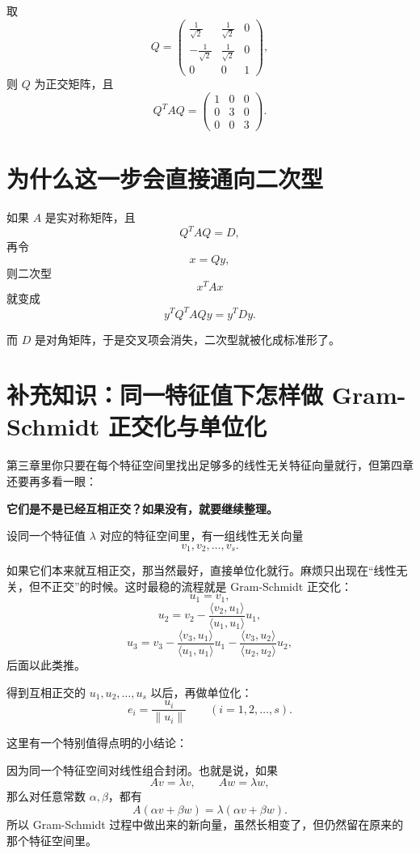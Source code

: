 \documentclass[11pt,oneside,UTF8]{ctexbook}
\newcommand{\important}[1]{\textcolor{Sakura}{\textbf{#1}}}
\begin{document}
\begin{examplebox}[例 9：完整做一次正交对角化]
取
\[
Q=
\begin{pmatrix}
\frac{1}{\sqrt2}&\frac{1}{\sqrt2}&0\\[0.4em]
-\frac{1}{\sqrt2}&\frac{1}{\sqrt2}&0\\[0.4em]
0&0&1
\end{pmatrix},
\]
则 \(Q\) 为正交矩阵，且
\[
Q^TAQ=
\begin{pmatrix}
1&0&0\\
0&3&0\\
0&0&3
\end{pmatrix}.
\]
\end{examplebox}

\section{为什么这一步会直接通向二次型}

如果 \(A\) 是实对称矩阵，且
\[
Q^TAQ=D,
\]
再令
\[
x=Qy,
\]
则二次型
\[
x^TAx
\]
就变成
\[
y^TQ^TAQy=y^TDy.
\]

而 \(D\) 是对角矩阵，于是交叉项会消失，二次型就被化成标准形了。

\section{补充知识：同一特征值下怎样做 Gram-Schmidt 正交化与单位化}

第三章里你只要在每个特征空间里找出足够多的线性无关特征向量就行，但第四章还要再多看一眼：
\begin{center}
\important{它们是不是已经互相正交？如果没有，就要继续整理。}
\end{center}

设同一个特征值 \(\lambda\) 对应的特征空间里，有一组线性无关向量
\[
v_1,v_2,\dots,v_s.
\]

如果它们本来就互相正交，那当然最好，直接单位化就行。麻烦只出现在“线性无关，但不正交”的时候。这时最稳的流程就是 Gram-Schmidt 正交化：
\[
u_1=v_1,
\]
\[
u_2=v_2-\frac{\langle v_2,u_1\rangle}{\langle u_1,u_1\rangle}u_1,
\]
\[
u_3=v_3-\frac{\langle v_3,u_1\rangle}{\langle u_1,u_1\rangle}u_1-\frac{\langle v_3,u_2\rangle}{\langle u_2,u_2\rangle}u_2,
\]
后面以此类推。

得到互相正交的 \(u_1,u_2,\dots,u_s\) 以后，再做单位化：
\[
e_i=\frac{u_i}{\|u_i\|}\qquad (i=1,2,\dots,s).
\]

这里有一个特别值得点明的小结论：
\begin{summarybox}[为什么正交化以后仍然是同一个特征值的特征向量]
因为同一个特征空间对线性组合封闭。也就是说，如果
\[
Av=\lambda v,\qquad Aw=\lambda w,
\]
那么对任意常数 \(\alpha,\beta\)，都有
\[
A(\alpha v+\beta w)=\lambda(\alpha v+\beta w).
\]
所以 Gram-Schmidt 过程中做出来的新向量，虽然长相变了，但仍然留在原来的那个特征空间里。
\end{summarybox}
\end{document}
